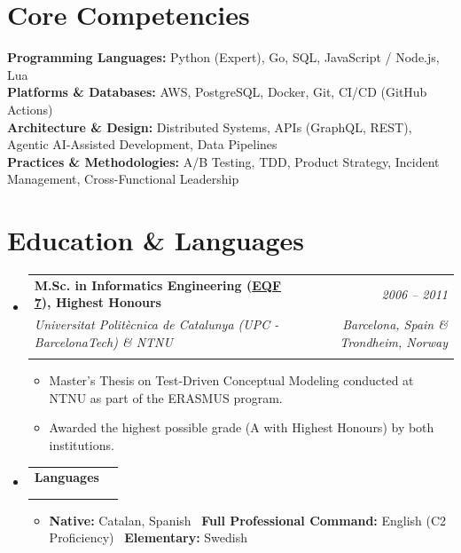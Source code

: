 \documentclass[a4paper,11pt]{article}
\makeatletter
\newcommand{\resumeItem}[1]{
  \item\small{
    {#1 \vspace{-2pt}}
  }
}
\newcommand{\resumeSubHeadingListStart}{\begin{itemize}[leftmargin=0.0in, label={}]}
\newcommand{\resumeSubHeadingListEnd}{\end{itemize}}
\newcommand{\resumeItemListStart}{\begin{itemize}}
\newcommand{\resumeItemListEnd}{\end{itemize}\vspace{-5pt}}
\newcommand{\resumeSubheadingSingleLine}[4]{
  \item
    \begin{tabular*}{\textwidth}{l@{\extracolsep{\fill}}r}
      \textbf{#1} & \textit{#2} \\
      \if\relax\detokenize{#3}\relax\else
        \textit{\small#3} & \textit{\small #4} \\
      \fi
    \end{tabular*}
    \vspace{-2pt}
}
\makeatother
\begin{document}

\vspace{0.5em}

\section{Core Competencies}
\begin{itemize}[leftmargin=0.05in, label={}]
    \small{\item{
        \textbf{Programming Languages:}{ \hfill Python (Expert), Go, SQL, JavaScript / Node.js, Lua} \\
        \textbf{Platforms \& Databases:}{ \hfill AWS, PostgreSQL, Docker, Git, CI/CD (GitHub Actions)} \\
        \textbf{Architecture \& Design:}{ \hfill Distributed Systems, APIs (GraphQL, REST), Agentic AI-Assisted Development, Data Pipelines} \\
        \textbf{Practices \& Methodologies:}{ \hfill A/B Testing, TDD, Product Strategy, Incident Management, Cross-Functional Leadership} \\
    }}
\end{itemize}

\vspace{-0.4em}

\section{Education \& Languages}
\resumeSubHeadingListStart
    \resumeSubheadingSingleLine
        {M.Sc. in Informatics Engineering (\href{ https://europass.europa.eu/en/description-eight-eqf-levels#:~:text=Level\%207}{EQF 7}), \textbf{Highest Honours}}{2006 – 2011}
        {Universitat Politècnica de Catalunya (UPC - BarcelonaTech) \& NTNU}{Barcelona, Spain \& Trondheim, Norway}
        \vspace{-0.5em}
        \resumeItemListStart
            \resumeItem{Master's Thesis on Test-Driven Conceptual Modeling conducted at NTNU as part of the ERASMUS program.}
            \resumeItem{Awarded the highest possible grade (A with Highest Honours) by both institutions.}
        \resumeItemListEnd

    \vspace{0.1em}
    \resumeSubheadingSingleLine
        {Languages}{}
        {}{}
        \vspace{-1em}
        \resumeItemListStart
            \resumeItem{\textbf{Native:} Catalan, Spanish \textbullet\ \textbf{Full Professional Command:} English (C2 Proficiency) \textbullet\ \textbf{Elementary:} Swedish}
        \resumeItemListEnd
\resumeSubHeadingListEnd
\end{document}
